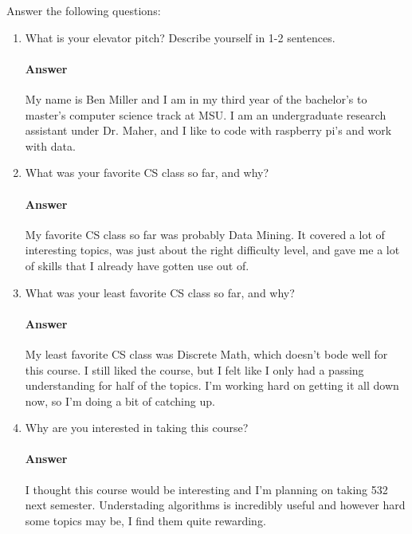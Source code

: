 \documentclass{article}
\begin{document}
Answer the following questions:
\begin{enumerate}
    \item What is your elevator pitch?  Describe yourself in 1-2
          sentences.
          
          \paragraph{Answer} My name is Ben Miller and I am in my third year of the bachelor's to master's 
          computer science track at MSU. I am an undergraduate research assistant under Dr. Maher, and I like to
          code with raspberry pi's and work with data.
          
    \item What was your favorite CS class so far, and why?
          
          \paragraph{Answer} My favorite CS class so far was probably Data Mining. It covered a lot of interesting topics,
          was just about the right difficulty level, and gave me a lot of skills that I already have gotten use out of.
          
    \item What was your least favorite CS class so far, and why?
          
          \paragraph{Answer} My least favorite CS class was Discrete Math, which doesn't bode well for this course.
          I still liked the course, but I felt like I only had a passing understanding for half of the topics.
          I'm working hard on getting it all down now, so I'm doing a bit of catching up.
          
    \item Why are you interested in taking this course?
          
          \paragraph{Answer} I thought this course would be interesting and I'm planning on taking 532 next semester.
          Understading algorithms is incredibly useful and however hard some topics may be, I find them quite rewarding.
          

\end{enumerate}
\end{document}
